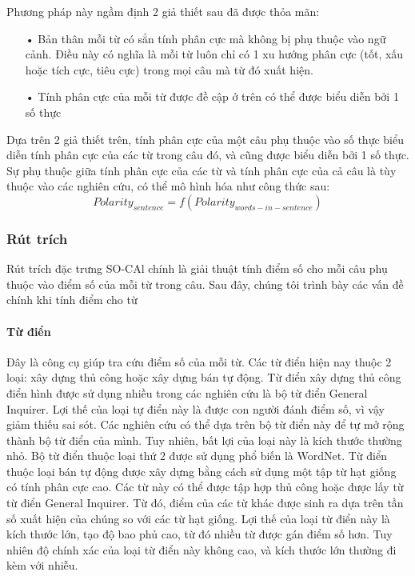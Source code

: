 Phương pháp này ngầm định 2 giả thiết sau đã được thỏa mãn:
\begin{itemize}
\item[•] Bản thân mỗi từ có sẳn tính phân cực mà không bị phụ thuộc vào ngữ cảnh. Điều này có nghĩa là mỗi từ luôn chỉ có 1 xu hướng phân cực (tốt, xấu hoặc tích cực, tiêu cực) trong mọi câu mà từ đó xuất hiện.
\item[•] Tính phân cực của mỗi từ được đề cập ở trên có thể được biểu diễn bởi 1 số thực
\end{itemize}
Dựa trên 2 giả thiết trên, tính phân cực của một câu phụ thuộc vào số thực biểu diễn tính phân cực của các từ trong câu đó, và cũng được biểu diễn bởi 1 số thực. Sự phụ thuộc giữa tính phân cực của các từ và tính phân cực của cả câu là tùy thuộc vào các nghiên cứu, có thể mô hình hóa như công thức sau:
\begin{equation}
Polarity_{sentence}=f(Polarity_{words-in-sentence})
\end{equation}
\subsubsection*{Rút trích}
Rút trích đặc trưng SO-CAl chính là giải thuật tính điểm số cho mỗi câu phụ thuộc vào điểm số của mỗi từ trong câu. Sau đây, chúng tôi trình bày các vấn đề chính khi tính điểm cho từ
\paragraph*{Từ điển}
Đây là công cụ giúp tra cứu điểm số của mỗi từ. Các từ điển hiện nay thuộc 2 loại: xây dựng thủ công hoặc xây dựng bán tự động. Từ điển xây dựng thủ công điển hình được sử dụng nhiều trong các nghiên cứu là bộ từ điển General Inquirer. Lợi thế của loại tự điển này là được con người đánh điểm số, vì vậy giảm thiếu sai sót. Các nghiên cứu có thể dựa trên bộ từ điển này để tự mở rộng thành bộ từ điển của mình. Tuy nhiên, bất lợi của loại này là kích thước thường nhỏ. Bộ từ điển thuộc loại thứ 2 được sử dụng phổ biến là WordNet. Từ điển thuộc loại bán tự động được xây dựng bằng cách sử dụng một tập từ hạt giống có tính phân cực cao. Các từ này có thể được tập hợp thủ công hoặc được lấy từ từ điển General Inquirer. Từ đó, điểm của các từ khác được sinh ra dựa trên tần số xuất hiện của chúng so với các từ hạt giống. Lợi thế của loại từ điển này là kích thước lớn, tạo độ bao phủ cao, từ đó nhiều từ được gán điểm số hơn. Tuy nhiên độ chính xác của loại từ điển này không cao, và kích thước lớn thường đi kèm với nhiễu. \\


